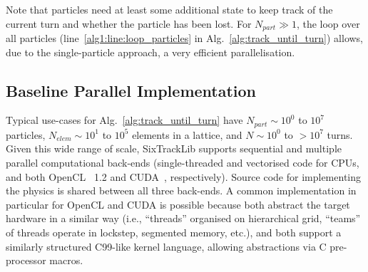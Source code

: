 \documentclass[a4paper,
               refpage,       %
               keeplastbox,   %
               ]{jacow}
\begin{document}
Note that particles need at least some additional state to keep track of the current turn and whether the particle has been lost. For $N_{part} \gg 1$, the loop over all particles (line~\ref{alg1:line:loop_particles} in Alg.~\ref{alg:track_until_turn}) allows, due to the single-particle approach, a very efficient parallelisation. 

\subsection{Baseline Parallel Implementation}
Typical use-cases for Alg.~\ref{alg:track_until_turn} have $N_{part} \sim 10^0$ to $10^7$ particles, $N_{elem} \sim 10^1$ to $10^5$ elements in a lattice, and $N \sim 10^0$ to $>10^7$ turns. Given this wide range of scale, SixTrackLib supports sequential and multiple parallel computational back-ends (single-threaded and vectorised code for CPUs, and both OpenCL~\cite{stone-opencl-2010} 1.2 and CUDA~\cite{nickolls-cuda-2008}, respectively). Source code for implementing the physics is shared between all three back-ends. A common implementation in particular for OpenCL and CUDA is possible because both
abstract the target hardware in a similar way (i.e., ``threads'' organised on hierarchical grid, ``teams'' of threads operate in lockstep, segmented memory, etc.), and both support a similarly structured C99-like kernel language, allowing abstractions via C pre-processor macros.
\end{document}
